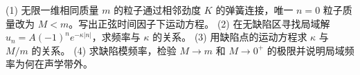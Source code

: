 (1) 无限一维相同质量 \(m\) 的粒子通过相邻劲度 \(K\) 的弹簧连接，唯一 \(n=0\) 粒子质量改为 \(M<m\)。写出正弦时间因子下运动方程。
(2) 在无缺陷区寻找局域解 \(u_n=A(-1)^n e^{-\kappa|n|}\)，求频率与 \(\kappa\) 的关系。
(3) 用缺陷点的运动方程求 \(\kappa\) 与 \(M/m\) 的关系。
(4) 求缺陷模频率，检验 \(M\to m\) 和 \(M\to0^+\) 的极限并说明局域频率为何在声学带外。
